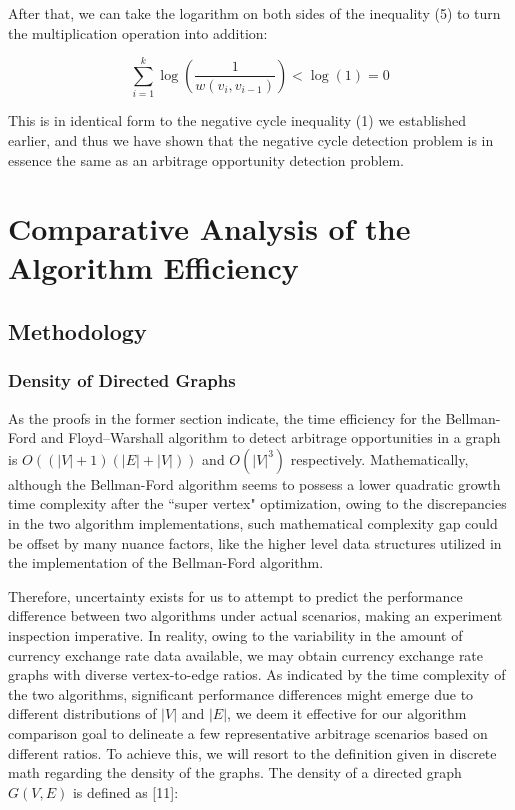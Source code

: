 \documentclass[12pt]{article}
\begin{document}
After that, we can take the logarithm on both sides of the inequality (5) to turn the multiplication operation into addition:

\begin{equation}
    \sum^{k}_{i=1} \log{\left(\frac{1}{w(v_i, v_{i-1})}\right) } < \log(1) = 0 
\end{equation}

This is in identical form to the negative cycle inequality (1) we established earlier, and thus we have shown that the negative cycle detection problem is in essence the same as an arbitrage opportunity detection problem.

\section{Comparative Analysis of the Algorithm Efficiency}
\subsection{Methodology}
\subsubsection{Density of Directed Graphs}
As the proofs in the former section indicate, the time efficiency for the Bellman-Ford and Floyd–Warshall algorithm to detect arbitrage opportunities in a graph is $O\left(\left(|V|+1\right)\left(|E|+|V|\right)\right)$ and $O\left(|V|^3\right)$ respectively. Mathematically, although the Bellman-Ford algorithm seems to possess a lower quadratic growth time complexity after the ``super vertex" optimization, owing to the discrepancies in the two algorithm implementations, such mathematical complexity gap could be offset by many nuance factors, like the higher level data structures utilized in the implementation of the Bellman-Ford algorithm. 

\hspace*{\fill} %

Therefore, uncertainty exists for us to attempt to predict the performance difference between two algorithms under actual scenarios, making an experiment inspection imperative. In reality, owing to the variability in the amount of currency exchange rate data available, we may obtain currency exchange rate graphs with diverse vertex-to-edge ratios. As indicated by the time complexity of the two algorithms, significant performance differences might emerge due to different distributions of $|V|$ and $|E|$, we deem it effective for our algorithm comparison goal to delineate a few representative arbitrage scenarios based on different ratios. To achieve this, we will resort to the definition given in discrete math regarding the density of the graphs. The density of a directed graph $G(V, E)$ is defined as [11]:
\end{document}
